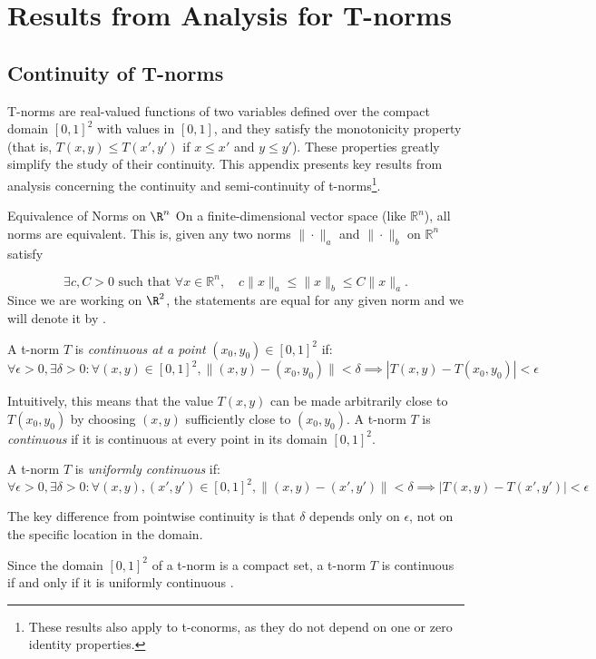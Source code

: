 \chapter{Results from Analysis for T-norms}

\section{Continuity of T-norms}
\label{app:cont_tnorms}
T-norms are real-valued functions of two variables defined over the compact domain $[0,1]^2$ with values in $[0,1]$, and they satisfy the monotonicity property (that is, $T(x,y) \le T(x',y')$ if $x \le x'$ and $y \le y'$). These properties greatly simplify the study of their continuity. This appendix presents key results from analysis concerning the continuity and semi-continuity of t-norms\footnote{These results also apply to t-conorms, as they do not depend on one or zero identity properties.}.

\begin{notation}{Equivalence of Norms on $\R^n$}
    On a finite-dimensional vector space (like $\mathbb{R}^n$), all norms are equivalent. This is, given any two norms $\|\cdot\|_a$ and $\|\cdot\|_b$ on $\mathbb{R}^n$ satisfy

 $$
 \exists c, C > 0 \text{ such that } \forall x \in \mathbb{R}^n, \quad c\|x\|_a \leq \|x\|_b \leq C\|x\|_a.
 $$
 Since we are working on $\R^2$, the statements are equal for any given norm and we will denote it by \say{$\|\cdot\|$}.
\end{notation}

\begin{definition}[Continuity]
A t-norm $T$ is \emph{continuous at a point} $(x_0, y_0) \in [0,1]^2$ if:
\[
\forall \epsilon > 0, \exists \delta > 0 : \forall (x,y) \in [0,1]^2, \|(x,y) - (x_0,y_0)\| < \delta \implies |T(x,y) - T(x_0,y_0)| < \epsilon
\]
\end{definition}

Intuitively, this means that the value $T(x,y)$ can be made arbitrarily close to $T(x_0,y_0)$ by choosing $(x,y)$ sufficiently close to $(x_0,y_0)$. A t-norm $T$ is \emph{continuous} if it is continuous at every point in its domain $[0,1]^2$.

\begin{definition}
A t-norm $T$ is \emph{uniformly continuous} if:
\[
\forall \epsilon > 0, \exists \delta > 0 : \forall (x,y),(x',y') \in [0,1]^2, \|(x,y) - (x',y')\| < \delta \implies |T(x,y) - T(x',y')| < \epsilon
\]
\end{definition}
The key difference from pointwise continuity is that $\delta$ depends only on $\epsilon$, not on the specific location in the domain.
\begin{remark}
    Since the domain $[0,1]^2$ of a t-norm is a compact set, a t-norm $T$ is continuous if and only if it is uniformly continuous \cite[p.~30]{Klement2000}.
\end{remark}

